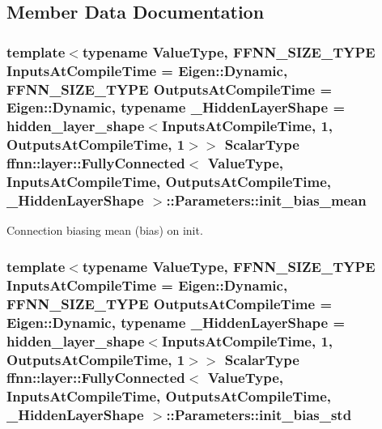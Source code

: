 \subsection{Member Data Documentation}
\hypertarget{structffnn_1_1layer_1_1_fully_connected_1_1_parameters_ae41af8fbdeadb550592c9c87fa1c3e91}{
\subsubsection[{init\-\_\-bias\-\_\-mean}]{\setlength{\rightskip}{0pt plus 5cm}template$<$typename Value\-Type, F\-F\-N\-N\-\_\-\-S\-I\-Z\-E\-\_\-\-T\-Y\-P\-E Inputs\-At\-Compile\-Time = Eigen\-::\-Dynamic, F\-F\-N\-N\-\_\-\-S\-I\-Z\-E\-\_\-\-T\-Y\-P\-E Outputs\-At\-Compile\-Time = Eigen\-::\-Dynamic, typename \-\_\-\-Hidden\-Layer\-Shape = hidden\-\_\-layer\-\_\-shape$<$\-Inputs\-At\-Compile\-Time, 1, Outputs\-At\-Compile\-Time, 1$>$$>$ {\bf Scalar\-Type} {\bf ffnn\-::layer\-::\-Fully\-Connected}$<$ Value\-Type, Inputs\-At\-Compile\-Time, Outputs\-At\-Compile\-Time, \-\_\-\-Hidden\-Layer\-Shape $>$\-::Parameters\-::init\-\_\-bias\-\_\-mean}}\label{structffnn_1_1layer_1_1_fully_connected_1_1_parameters_ae41af8fbdeadb550592c9c87fa1c3e91}


Connection biasing mean (bias) on init. 

\hypertarget{structffnn_1_1layer_1_1_fully_connected_1_1_parameters_a25bc897be3defed5329b1df1111c0ace}{
\subsubsection[{init\-\_\-bias\-\_\-std}]{\setlength{\rightskip}{0pt plus 5cm}template$<$typename Value\-Type, F\-F\-N\-N\-\_\-\-S\-I\-Z\-E\-\_\-\-T\-Y\-P\-E Inputs\-At\-Compile\-Time = Eigen\-::\-Dynamic, F\-F\-N\-N\-\_\-\-S\-I\-Z\-E\-\_\-\-T\-Y\-P\-E Outputs\-At\-Compile\-Time = Eigen\-::\-Dynamic, typename \-\_\-\-Hidden\-Layer\-Shape = hidden\-\_\-layer\-\_\-shape$<$\-Inputs\-At\-Compile\-Time, 1, Outputs\-At\-Compile\-Time, 1$>$$>$ {\bf Scalar\-Type} {\bf ffnn\-::layer\-::\-Fully\-Connected}$<$ Value\-Type, Inputs\-At\-Compile\-Time, Outputs\-At\-Compile\-Time, \-\_\-\-Hidden\-Layer\-Shape $>$\-::Parameters\-::init\-\_\-bias\-\_\-std}}\label{structffnn_1_1layer_1_1_fully_connected_1_1_parameters_a25bc897be3defed5329b1df1111c0ace}


